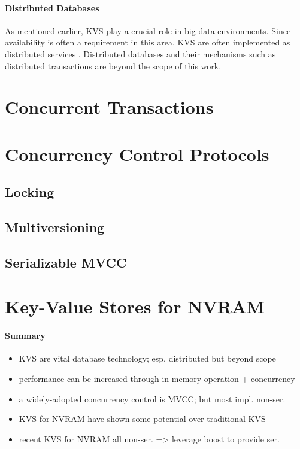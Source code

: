 \paragraph{Distributed Databases}

As mentioned earlier, KVS play a crucial role in big-data environments. Since
availability is often a requirement in this area, KVS are often implemented as
distributed services \cite{decandia2007dynamo, lakshman2010cassandra,
wang2015hydradb}. Distributed databases and their mechanisms such as distributed
transactions are beyond the scope of this work.

\section{Concurrent Transactions}

\section{Concurrency Control Protocols}

\subsection{Locking}

\subsection{Multiversioning}

\subsection{Serializable MVCC}

\section{Key-Value Stores for NVRAM}

\paragraph{Summary}

\begin{itemize}
    \item KVS are vital database technology; esp. distributed but beyond scope
    \item performance can be increased through in-memory operation + concurrency
    \item a widely-adopted concurrency control is MVCC; but most impl. non-ser.
    \item KVS for NVRAM have shown some potential over traditional KVS
    \item recent KVS for NVRAM all non-ser. => leverage boost to provide ser.
\end{itemize}
